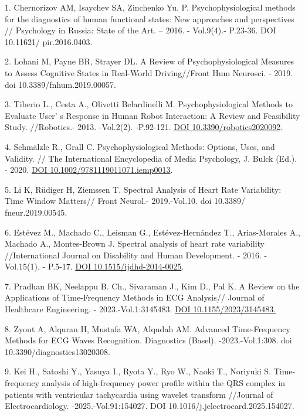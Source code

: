 \begin{refs}
1. Chernorizov AM, Isaychev SA, Zinchenko Yu. P. Psychophysiological
methods for the diagnostics of human functional states: New approaches
and perspectives // Psychology in Russia: State of the Art. -- 2016. -
Vol.9(4).- P.23-36. DOI 10.11621/ pir.2016.0403.

2. Lohani M, Payne BR, Strayer DL. A Review of Psychophysiological
Measures to Assess Cognitive States in Real-World Driving//Front Hum
Neurosci. - 2019. doi 10.3389/fnhum.2019.00057.

3. Tiberio L., Cesta A., Olivetti Belardinelli M. Psychophysiological
Methods to Evaluate User' s Response in Human Robot
Interaction: A Review and Feasibility Study. //Robotics.-
2013. -Vol.2(2). -P.92-121.
\href{https://doi.org/10.3390/robotics2020092}{DOI
10.3390/robotics2020092}.

4. Schmälzle R., Grall C. Psychophysiological Methods: Options, Uses,
and Validity. // The International Encyclopedia of Media Psychology, J.
Bulck (Ed.). - 2020.
\href{https://doi.org/10.1002/9781119011071.iemp0013}{DOI
10.1002/9781119011071.iemp0013}.

5. Li K, Rüdiger H, Ziemssen T. Spectral Analysis of Heart Rate
Variability: Time Window Matters// Front Neurol.- 2019.-Vol.10. doi
10.3389/ fneur.2019.00545.

6. Estévez M., Machado C., Leisman G., Estévez-Hernández T.,
Arias-Morales A., Machado A., Montes-Brown J. Spectral analysis of heart
rate variability //International Journal on Disability and Human
Development. - 2016. -Vol.15(1). - P.5-17.
\href{https://doi.org/10.1515/ijdhd-2014-0025}{DOI
10.1515/ijdhd-2014-0025}.

7. Pradhan BK, Neelappu B. Ch., Sivaraman J., Kim D., Pal K. A Review on
the Applications of Time-Frequency Methods in ECG Analysis// Journal of
Healthcare Engineering. - 2023.-Vol.1:3145483.
\href{https://doi.org/10.1155/2023/3145483}{DOI 10.1155/2023/3145483.}

8. Zyout A, Alquran H, Mustafa WA, Alqudah AM. Advanced Time-Frequency
Methods for ECG Waves Recognition. Diagnostics (Basel).
-2023.-Vol.1:308. doi 10.3390/diagnostics13020308.

9. Kei H., Satoshi Y., Yasuya I., Ryota Y., Ryo W., Naoki T., Noriyuki
S. Time-frequency analysis of high-frequency power profile within the
QRS complex in patients with ventricular tachycardia using wavelet
transform //Journal of Electrocardiology. -2025.-Vol.91:154027.
DOI 10.1016/j.jelectrocard.2025.154027.


\end{refs}
